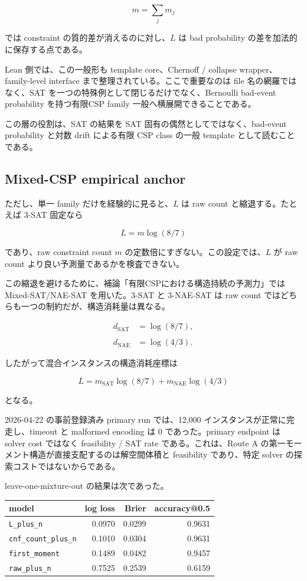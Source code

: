\documentclass[12pt,a4paper]{article}
\begin{document}
\[
m=\sum_{j} m_{j}
\]

では constraint の質的差が消えるのに対し、\(L\) は bad probability の差を加法的に保存する点である。

Lean 側では、この一般形も template core、Chernoff / collapse wrapper、family-level interface まで整理されている。ここで重要なのは file 名の網羅ではなく、SAT を一つの特殊例として閉じるだけでなく、Bernoulli bad-event probability を持つ有限CSP family 一般へ横展開できることである。

この層の役割は、SAT の結果を SAT 固有の偶然としてではなく、bad-event probability と対数 drift による有限 CSP class の一般 template として読むことである。

\subsection{Mixed-CSP empirical anchor}\label{mixed-csp-empirical-anchor}

ただし、単一 family だけを経験的に見ると、\(L\) は raw count と縮退する。たとえば 3-SAT 固定なら

\[
L=m\log(8/7)
\]

であり、raw constraint count \(m\) の定数倍にすぎない。この設定では、\(L\) が raw count より良い予測量であるかを検査できない。

この縮退を避けるために、補論「有限CSPにおける構造持続の予測力」では Mixed-SAT/NAE-SAT を用いた。3-SAT と 3-NAE-SAT は raw count ではどちらも一つの制約だが、構造消耗量は異なる。

\[
\begin{aligned}
d_{\mathrm{SAT}}&=\log(8/7), \\
\qquad \\
d_{\mathrm{NAE}}&=\log(4/3).
\end{aligned}
\]

したがって混合インスタンスの構造消耗座標は

\[
L = m_{\mathrm{SAT}}\log(8/7) + m_{\mathrm{NAE}}\log(4/3)
\]

となる。

2026-04-22 の事前登録済み primary run では、12,000 インスタンスが正常に完走し、timeout と malformed encoding は 0 であった。primary endpoint は solver cost ではなく feasibility / SAT rate である。これは、Route A の第一モーメント構造が直接支配するのは解空間体積と feasibility であり、特定 solver の探索コストではないからである。

leave-one-mixture-out の結果は次であった。

{\def\LTcaptype{table} %
\begin{longtable}[]{@{}lrrr@{}}
\toprule\noalign{}
model & log loss & Brier & accuracy@0.5 \\
\midrule\noalign{}
\endhead
\bottomrule\noalign{}
\endlastfoot
\texttt{L\_plus\_n} & 0.0970 & 0.0299 & 0.9631 \\
\texttt{cnf\_count\_plus\_n} & 0.1010 & 0.0304 & 0.9631 \\
\texttt{first\_moment} & 0.1489 & 0.0482 & 0.9457 \\
\texttt{raw\_plus\_n} & 0.7525 & 0.2539 & 0.6159 \\
\end{longtable}
}
\end{document}
